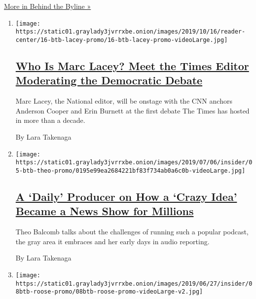 \href{/column/behind-the-byline}{More in Behind the Byline »}

\begin{enumerate}
\def\labelenumi{\arabic{enumi}.}
\item
  \texttt{[image: https://static01.graylady3jvrrxbe.onion/images/2019/10/16/reader-center/16-btb-lacey-promo/16-btb-lacey-promo-videoLarge.jpg]}

  \hypertarget{who-is-marc-lacey-meet-the-times-editor-moderating-the-democratic-debate}{%
  \subsection{\texorpdfstring{\href{/2019/10/14/reader-center/marc-lacey-debate.html}{Who
  Is Marc Lacey? Meet the Times Editor Moderating the Democratic
  Debate}}{Who Is Marc Lacey? Meet the Times Editor Moderating the Democratic Debate}}\label{who-is-marc-lacey-meet-the-times-editor-moderating-the-democratic-debate}}

  Marc Lacey, the National editor, will be onstage with the CNN anchors
  Anderson Cooper and Erin Burnett at the first debate The Times has
  hosted in more than a decade.

  By Lara Takenaga
\item
  \texttt{[image: https://static01.graylady3jvrrxbe.onion/images/2019/07/06/insider/05-btb-theo-promo/0195e99ea2684221bf83f734ab0a6c0b-videoLarge.jpg]}

  \hypertarget{a-daily-producer-on-how-a-crazy-idea-became-a-news-show-for-millions}{%
  \subsection{\texorpdfstring{\href{/2019/07/05/reader-center/behind-the-byline-theo-balcomb.html}{A
  `Daily' Producer on How a `Crazy Idea' Became a News Show for
  Millions}}{A `Daily' Producer on How a `Crazy Idea' Became a News Show for Millions}}\label{a-daily-producer-on-how-a-crazy-idea-became-a-news-show-for-millions}}

  Theo Balcomb talks about the challenges of running such a popular
  podcast, the gray area it embraces and her early days in audio
  reporting.

  By Lara Takenaga
\item
  \texttt{[image: https://static01.graylady3jvrrxbe.onion/images/2019/06/27/insider/08btb-roose-promo/08btb-roose-promo-videoLarge-v2.jpg]}

  \hypertarget{a-tech-columnist-on-how-he-avoids-twitter-trolls-and-finds-screen-free-escapes}{%
}
\end{enumerate}
